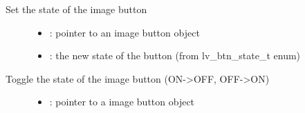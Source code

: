 \documentclass[letterpaper,10pt,english]{sphinxmanual}
\begin{document}

\begin{fulllineitems}
\label{\detokenize{object-types/imgbtn:_CPPv419lv_imgbtn_set_stateP8lv_obj_t14lv_btn_state_t}}%
\pysigstartmultiline
{}\label{\detokenize{object-types/imgbtn:lv__imgbtn_8h_1a76f3dcdade236d820b96b0767c0e28d5}}%
\pysigstopmultiline
Set the state of the image button \begin{description}
\item[{}] \leavevmode\begin{itemize}
\item {} 
: pointer to an image button object 

\item {} 
: the new state of the button (from lv\_btn\_state\_t enum) 

\end{itemize}

\end{description}


\end{fulllineitems}


\begin{fulllineitems}
\label{\detokenize{object-types/imgbtn:_CPPv416lv_imgbtn_toggleP8lv_obj_t}}%
\pysigstartmultiline
{}\label{\detokenize{object-types/imgbtn:lv__imgbtn_8h_1af5b5e747dca47200fa99faf94a2a8fbd}}%
\pysigstopmultiline
Toggle the state of the image button (ON-\textgreater{}OFF, OFF-\textgreater{}ON) \begin{description}
\item[{}] \leavevmode\begin{itemize}
\item {} 
: pointer to a image button object 

\end{itemize}

\end{description}


\end{fulllineitems}
\end{document}
